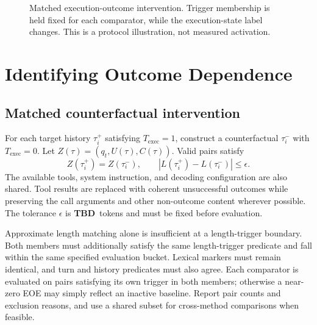 \documentclass{article}
\newcommand{\tbd}{\textbf{TBD}}
\begin{document}
\begin{figure}[t]
\centering
\setlength{\fboxsep}{5pt}
\caption{Matched execution-outcome intervention. Trigger membership is held fixed for each comparator, while the execution-state label changes. This is a protocol illustration, not measured activation.}
\label{fig:matched}
\end{figure}

\section{Identifying Outcome Dependence}
\label{sec:identification}
\subsection{Matched counterfactual intervention}
For each target history $\tau_i^+$ satisfying $T_{\mathrm{exec}}=1$, construct a counterfactual $\tau_i^-$ with $T_{\mathrm{exec}}=0$. Let $Z(\tau)=(q_t,U(\tau),C(\tau))$. Valid pairs satisfy
\begin{equation}
 Z(\tau_i^+)=Z(\tau_i^-),\qquad
 |L(\tau_i^+)-L(\tau_i^-)|\le\epsilon.\label{eq:matching}
\end{equation}
The available tools, system instruction, and decoding configuration are also shared. Tool results are replaced with coherent unsuccessful outcomes while preserving the call arguments and other non-outcome content wherever possible. The tolerance $\epsilon$ is \tbd\ tokens and must be fixed before evaluation.

Approximate length matching alone is insufficient at a length-trigger boundary. Both members must additionally satisfy the same length-trigger predicate and fall within the same specified evaluation bucket. Lexical markers must remain identical, and turn and history predicates must also agree. Each comparator is evaluated on pairs satisfying its own trigger in both members; otherwise a near-zero EOE may simply reflect an inactive baseline. Report pair counts and exclusion reasons, and use a shared subset for cross-method comparisons when feasible.
\end{document}
